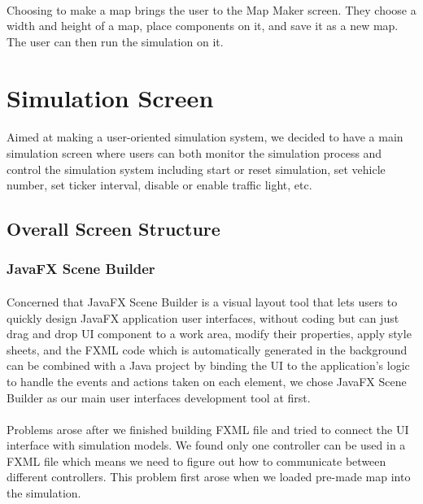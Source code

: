 \documentclass[a4paper,11pt,titlepage]{article}
\begin{document}
\paragraph{}
Choosing to make a map brings the user to the Map Maker screen. They choose a width and height of a map, place components on it, and save it as a new map. The user can then run the simulation on it. 
\section{Simulation Screen}
\paragraph{}
Aimed at making a user-oriented simulation system, we decided to have a main simulation screen where users can both monitor the simulation process and control the simulation system including start or reset simulation, set vehicle number, set ticker interval, disable or enable traffic light, etc.
\subsection{Overall Screen Structure}
\subsubsection{JavaFX Scene Builder}
\paragraph{}
Concerned that JavaFX Scene Builder is a visual layout tool that lets users to quickly design JavaFX application user interfaces, without coding but can just drag and drop UI component to a work area, modify their properties, apply style sheets, and the FXML code which is automatically generated in the background can be combined with a Java project by binding the UI to the application's logic to handle the events and actions taken on each element, we chose JavaFX Scene Builder as our main user interfaces development tool at first.
\paragraph{}
Problems arose after we finished building FXML file and  tried to connect the UI interface with simulation models. We found only one controller can be used in a FXML file which means we need to figure out how to communicate between different controllers. This problem first arose when we loaded pre-made map into the simulation. 
\end{document}
